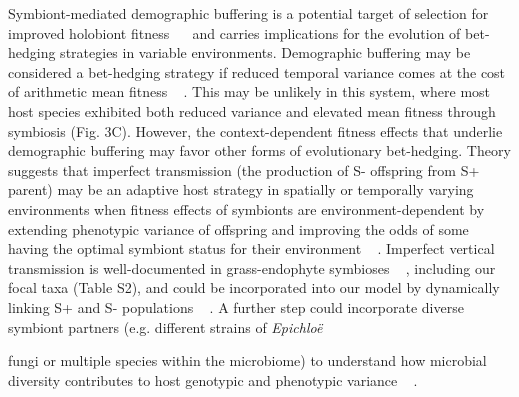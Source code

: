 \documentclass[lineno,sn-nature]{sn-jnl}%
\providecommand{\DIFadd}[1]{{\protect\color{blue}#1}} %
\providecommand{\DIFadd}[1]{{\protect\color{blue}\uwave{#1}}} %
\begin{document}
\DIFadd{Symbiont-mediated demographic buffering is a potential target of selection for improved holobiont fitness \mbox{%
\cite{vandenkoornhuyse2015importance} }\hspace{0pt}%
and carries implications for the evolution of bet-hedging strategies in variable environments. 
Demographic buffering may be considered a bet-hedging strategy if reduced temporal variance comes at the cost of arithmetic mean fitness \mbox{%
\cite{childs2010evolutionary}}\hspace{0pt}%
. 
This may be unlikely in this system, where most host species exhibited both reduced variance and elevated mean fitness through symbiosis (Fig. 3C). 
However, the context-dependent fitness effects that underlie demographic buffering may favor other forms of evolutionary bet-hedging. 
Theory suggests that imperfect transmission (the production of S- offspring from S+ parent) may be an adaptive host strategy in spatially or temporally varying environments when fitness effects of symbionts are environment-dependent by extending phenotypic variance of offspring and improving the odds of some having the optimal symbiont status for their environment \mbox{%
\cite{brown2019evolution,bruijning2022natural,lange2023impact}}\hspace{0pt}%
. 
Imperfect vertical transmission is well-documented in grass-endophyte symbioses \mbox{%
\cite{afkhami2008symbiosis}}\hspace{0pt}%
, including our focal taxa (Table S2), and could be incorporated into our model by dynamically linking S+ and S- populations \mbox{%
\cite{yule2013costs,chung2015fungal}}\hspace{0pt}%
.
A further step could incorporate diverse symbiont partners (e.g. different strains of }\emph{\DIFadd{Epichlo\"{e}}} \DIFadd{fungi or multiple species within the microbiome) to understand how microbial diversity contributes to host genotypic and phenotypic variance \mbox{%
\cite{henry2021microbiome}}\hspace{0pt}%
.

}
\end{document}
